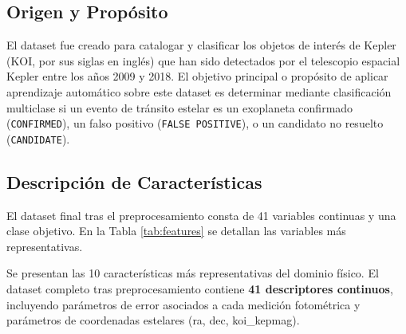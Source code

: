 \documentclass[12pt, letterpaper]{article}
\begin{document}
\subsection{Origen y Propósito}
El dataset fue creado para catalogar y clasificar los objetos de interés de Kepler (KOI, por sus siglas en inglés) que han sido detectados por el telescopio espacial Kepler entre los años 2009 y 2018. El objetivo principal o propósito de aplicar aprendizaje automático sobre este dataset es determinar mediante clasificación multiclase si un evento de tránsito estelar es un exoplaneta confirmado (\texttt{CONFIRMED}), un falso positivo (\texttt{FALSE POSITIVE}), o un candidato no resuelto (\texttt{CANDIDATE}).

\subsection{Descripción de Características}
El dataset final tras el preprocesamiento consta de 41 variables continuas y una clase objetivo. En la Tabla \ref{tab:features} se detallan las variables más representativas.

\begin{table}[H]
    \centering
    \caption{Características Principales del Dataset Kepler}
    \label{tab:features}
\end{table}
Se presentan las 10 características más representativas del dominio físico. El dataset completo tras preprocesamiento contiene \textbf{41 descriptores continuos}, incluyendo parámetros de error asociados a cada medición fotométrica y parámetros de coordenadas estelares (ra, dec, koi\_kepmag).
\end{document}
